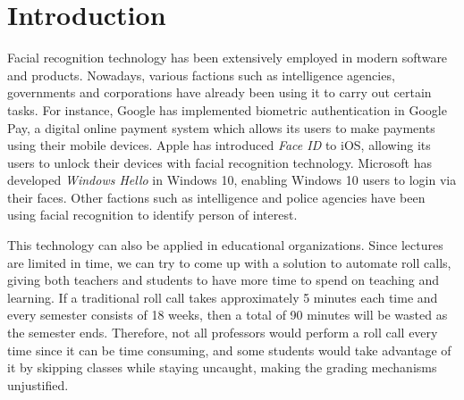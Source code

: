 \chapter{Introduction}
Facial recognition technology has been extensively employed in modern software and products. Nowadays, various factions
such as intelligence agencies, governments and corporations have already been using it to carry out certain tasks.
For instance, Google has implemented biometric authentication in Google Pay, a digital online payment system
which allows its users to make payments using their mobile devices. Apple has introduced \emph{Face ID} to iOS, allowing its users
to unlock their devices with facial recognition technology. Microsoft has developed \emph{Windows Hello} in Windows 10, enabling
Windows 10 users to login via their faces. Other factions such as intelligence and police agencies have been using facial recognition
to identify person of interest.

This technology can also be applied in educational organizations. Since lectures are limited in time, we can try to come up
with a solution to automate roll calls, giving both teachers and students to have more time to spend on teaching and learning.
If a traditional roll call takes approximately 5 minutes each time and every semester consists of 18 weeks, then a total of 90 minutes
will be wasted as the semester ends. Therefore, not all professors would perform a roll call every time since it can be time consuming,
and some students would take advantage of it by skipping classes while staying uncaught, making the grading mechanisms unjustified.





